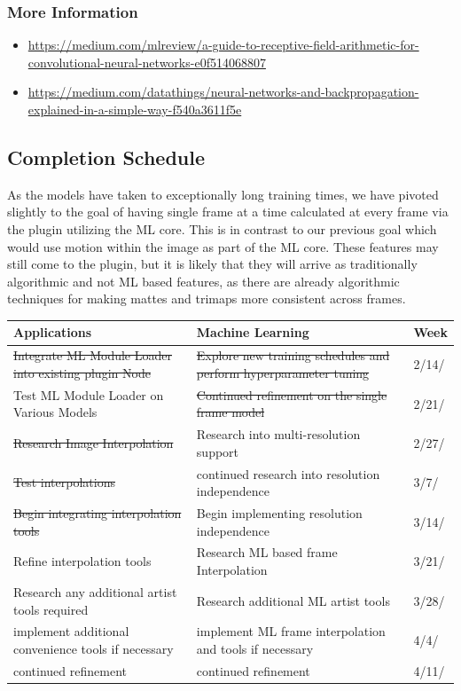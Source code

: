 \documentclass[15pt]{article}
\begin{document}
\subsubsection{More Information}
\label{sec:org4c4644b}
\begin{itemize}
\item \url{https://medium.com/mlreview/a-guide-to-receptive-field-arithmetic-for-convolutional-neural-networks-e0f514068807}
\item \url{https://medium.com/datathings/neural-networks-and-backpropagation-explained-in-a-simple-way-f540a3611f5e}
\end{itemize}
\subsection{Completion Schedule}
\label{sec:org6ca1953}
As the models have taken to exceptionally long training times, we have pivoted
slightly to the goal of having single frame at a time calculated at every frame
via the plugin utilizing the ML core. This is in contrast to our previous goal
which would use motion within the image as part of the ML core. These features
may still come to the plugin, but it is likely that they will arrive as
traditionally algorithmic and not ML based features, as there are already algorithmic techniques for
making mattes and trimaps more consistent across frames.
\begin{center}
\begin{tabularx}{\textwidth}{XXl}
Applications & Machine Learning & Week\\
\hline
\sout{Integrate ML Module Loader into existing plugin Node} & \sout{Explore new training schedules and perform hyperparameter tuning} & 2/14/\\
\hline
Test ML Module Loader on Various Models & \sout{Continued refinement on the single frame model} & 2/21/\\
\hline
\sout{Research Image Interpolation} & Research into multi-resolution support & 2/27/\\
\hline
\sout{Test interpolations} & continued research into resolution independence & 3/7/\\
\hline
\sout{Begin integrating interpolation tools} & Begin implementing resolution independence & 3/14/\\
\hline
Refine interpolation tools & Research ML based frame Interpolation & 3/21/\\
\hline
Research any additional artist tools required & Research additional ML artist tools & 3/28/\\
\hline
implement additional convenience tools if necessary & implement ML frame interpolation and tools if necessary & 4/4/\\
\hline
continued refinement & continued refinement & 4/11/\\
\end{tabularx}
\end{center}
\end{document}
